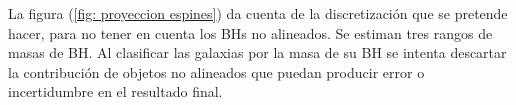La figura (\ref{fig: proyeccion espines}) da cuenta de la discretización que se pretende hacer, para no tener en cuenta los BHs no alineados. Se estiman tres rangos de masas de BH. Al clasificar las galaxias por la masa de su BH  se intenta  descartar la contribución de objetos no alineados que puedan producir error o incertidumbre en el resultado final. 

\begin{figure} 
\centering {} 

\end{figure}
